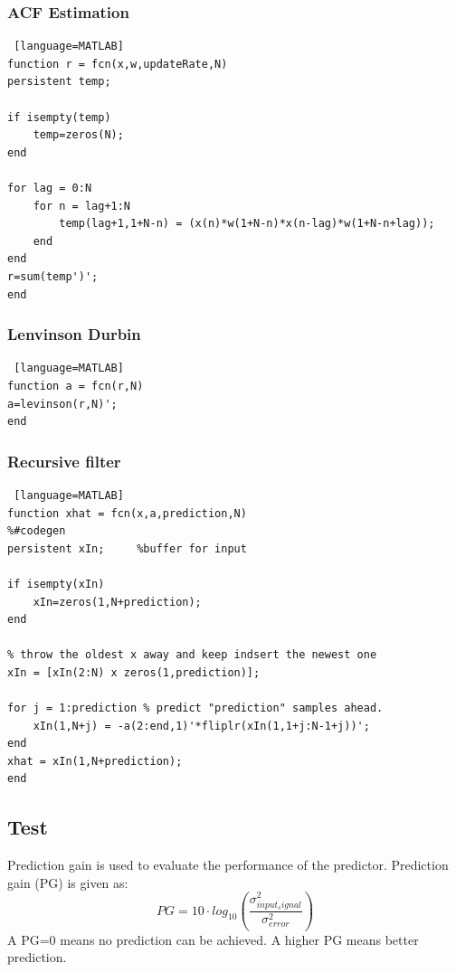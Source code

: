 \subsubsection{ACF Estimation}
\begin{lstlisting} [language=MATLAB]
function r = fcn(x,w,updateRate,N)
persistent temp;

if isempty(temp)
	temp=zeros(N);
end

for lag = 0:N
	for n = lag+1:N
		temp(lag+1,1+N-n) = (x(n)*w(1+N-n)*x(n-lag)*w(1+N-n+lag));
	end
end
r=sum(temp')';
end
\end{lstlisting}

\subsubsection{Lenvinson Durbin}
\begin{lstlisting} [language=MATLAB]
function a = fcn(r,N)
a=levinson(r,N)';
end
\end{lstlisting}

\subsubsection{Recursive filter}
\begin{lstlisting} [language=MATLAB]
function xhat = fcn(x,a,prediction,N)
%#codegen
persistent xIn;     %buffer for input

if isempty(xIn)
	xIn=zeros(1,N+prediction);
end

% throw the oldest x away and keep indsert the newest one
xIn = [xIn(2:N) x zeros(1,prediction)]; 

for j = 1:prediction % predict "prediction" samples ahead. 
	xIn(1,N+j) = -a(2:end,1)'*fliplr(xIn(1,1+j:N-1+j))';
end
xhat = xIn(1,N+prediction);
end
\end{lstlisting}

\subsection{Test}
Prediction gain is used to evaluate the performance of the predictor. Prediction gain (PG) is given as:
\begin{equation}
	PG=10 \cdot log_{10}(\frac{\sigma^2_{input_signal}}{\sigma^2_{error}})
\end{equation} 
A PG=0 means no prediction can be achieved. A higher PG means better prediction. \\\\

